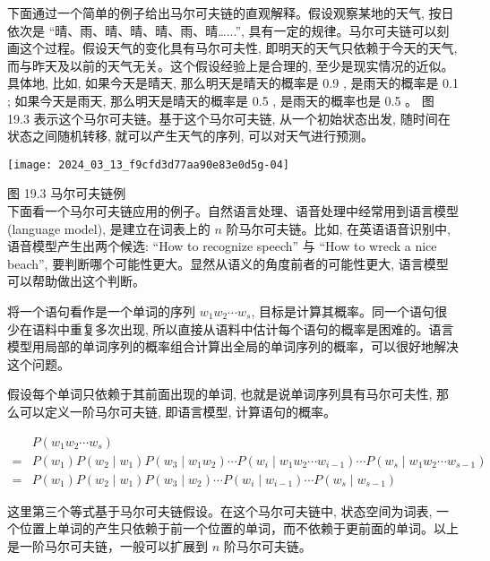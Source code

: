 \documentclass[10pt]{article}
\begin{document}
\begin{CJK*}{UTF8}{bsmi}
下面通过一个简单的例子给出马尔可夫链的直观解释。假设观察某地的天气, 按日依次是 “晴、雨、晴、晴、晴、雨、晴…...”, 具有一定的规律。马尔可夫链可以刻画这个过程。假设天气的变化具有马尔可夫性, 即明天的天气只依赖于今天的天气, 而与昨天及以前的天气无关。这个假设经验上是合理的, 至少是现实情况的近似。具体地, 比如, 如果今天是晴天, 那么明天是晴天的概率是 0.9 , 是雨天的概率是 0.1 ; 如果今天是雨天, 那么明天是晴天的概率是 0.5 , 是雨天的概率也是 0.5 。 图 19.3 表示这个马尔可夫链。基于这个马尔可夫链, 从一个初始状态出发, 随时间在状态之间随机转移, 就可以产生天气的序列, 可以对天气进行预测。

\begin{center}
\texttt{[image: 2024\_03\_13\_f9cfd3d77aa90e83e0d5g-04]}
\end{center}

图 19.3 马尔可夫链例\\
下面看一个马尔可夫链应用的例子。自然语言处理、语音处理中经常用到语言模型 (language model), 是建立在词表上的 $n$ 阶马尔可夫链。比如, 在英语语音识别中, 语音模型产生出两个候选: “How to recognize speech” 与 “How to wreck a nice beach”, 要判断哪个可能性更大。显然从语义的角度前者的可能性更大, 语言模型可以帮助做出这个判断。

将一个语句看作是一个单词的序列 $w_{1} w_{2} \cdots w_{s}$, 目标是计算其概率。同一个语句很少在语料中重复多次出现, 所以直接从语料中估计每个语句的概率是困难的。语言模型用局部的单词序列的概率组合计算出全局的单词序列的概率，可以很好地解决这个问题。

假设每个单词只依赖于其前面出现的单词, 也就是说单词序列具有马尔可夫性, 那么可以定义一阶马尔可夫链, 即语言模型, 计算语句的概率。

$$
\begin{aligned}
& P\left(w_{1} w_{2} \cdots w_{s}\right) \\
= & P\left(w_{1}\right) P\left(w_{2} \mid w_{1}\right) P\left(w_{3} \mid w_{1} w_{2}\right) \cdots P\left(w_{i} \mid w_{1} w_{2} \cdots w_{i-1}\right) \cdots P\left(w_{s} \mid w_{1} w_{2} \cdots w_{s-1}\right) \\
= & P\left(w_{1}\right) P\left(w_{2} \mid w_{1}\right) P\left(w_{3} \mid w_{2}\right) \cdots P\left(w_{i} \mid w_{i-1}\right) \cdots P\left(w_{s} \mid w_{s-1}\right)
\end{aligned}
$$

这里第三个等式基于马尔可夫链假设。在这个马尔可夫链中, 状态空间为词表, 一个位置上单词的产生只依赖于前一个位置的单词，而不依赖于更前面的单词。以上是一阶马尔可夫链，一般可以扩展到 $n$ 阶马尔可夫链。


\end{CJK*}
\end{document}
